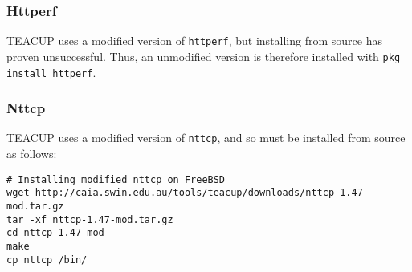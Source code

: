 \subsubsection{Httperf}

TEACUP uses a modified version of \lstinline{httperf}, but installing from source has proven unsuccessful. Thus, an unmodified version is therefore installed with \lstinline{pkg install httperf}.

\subsubsection{Nttcp}

TEACUP uses a modified version of \lstinline{nttcp}, and so must be installed from source as follows:

\begin{verbatim}
# Installing modified nttcp on FreeBSD
wget http://caia.swin.edu.au/tools/teacup/downloads/nttcp-1.47-mod.tar.gz
tar -xf nttcp-1.47-mod.tar.gz
cd nttcp-1.47-mod
make
cp nttcp /bin/
\end{verbatim}